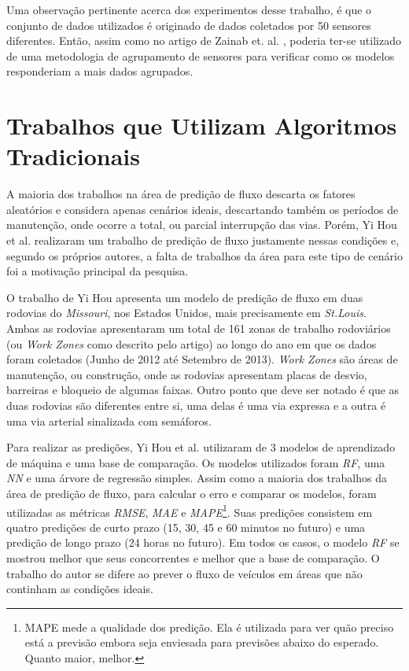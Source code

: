 Uma observação pertinente acerca dos experimentos desse trabalho, é que o conjunto de dados utilizados é originado de dados coletados por 50 sensores diferentes. Então, assim como no artigo de Zainab et. al. \cite{Zainab_2018}, poderia ter-se utilizado de uma metodologia de agrupamento de sensores para verificar como os modelos responderiam a mais dados agrupados.

\section{Trabalhos que Utilizam Algoritmos Tradicionais}

A maioria dos trabalhos na área de predição de fluxo descarta os fatores aleatórios e considera apenas cenários ideais, descartando também os períodos de manutenção, onde ocorre a total, ou parcial interrupção das vias. Porém, Yi Hou et al. \cite{hou2014traffic} realizaram um trabalho de predição de fluxo justamente nessas condições e, segundo os próprios autores, a falta de trabalhos da área para este tipo de cenário foi a motivação principal da pesquisa. 

O trabalho de Yi Hou apresenta um modelo de predição de fluxo em duas rodovias do \textit{Missouri}, nos Estados Unidos, mais precisamente em \textit{St.Louis}. Ambas as rodovias apresentaram um total de 161 zonas de trabalho rodoviários (ou \textit{Work Zones} como descrito pelo artigo) ao longo do ano em que os dados foram coletados (Junho de 2012 até Setembro de 2013). \textit{Work Zones} são áreas de manutenção, ou construção, onde as rodovias apresentam placas de desvio, barreiras e bloqueio de algumas faixas. Outro ponto que deve ser notado é que as duas rodovias são diferentes entre si, uma delas é uma via expressa e a outra é uma via arterial sinalizada com semáforos.

Para realizar as predições, Yi Hou et al. utilizaram de 3 modelos de aprendizado de máquina e uma base de comparação. Os modelos utilizados foram \textit{\acrshort{RF}}, uma \textit{\acrfull{NN}} e uma árvore de regressão simples. Assim como a maioria dos trabalhos da área de predição de fluxo, para calcular o erro e comparar os modelos, foram utilizadas as métricas \textit{\acrshort{RMSE}}, \textit{\acrshort{MAE}} e \textit{\acrfull{MAPE}}\footnote{MAPE mede a qualidade dos predição. Ela é utilizada para ver quão preciso está a previsão embora seja enviesada para previsões abaixo do esperado. Quanto maior, melhor.}. Suas predições consistem em quatro predições de curto prazo (15, 30, 45 e 60 minutos no futuro) e uma predição de longo prazo (24 horas no futuro). Em todos os casos, o modelo \textit{\acrshort{RF}} se mostrou melhor que seus concorrentes e melhor que a base de comparação. O trabalho do autor se difere ao prever o fluxo de veículos em áreas que não continham as condições ideais.


